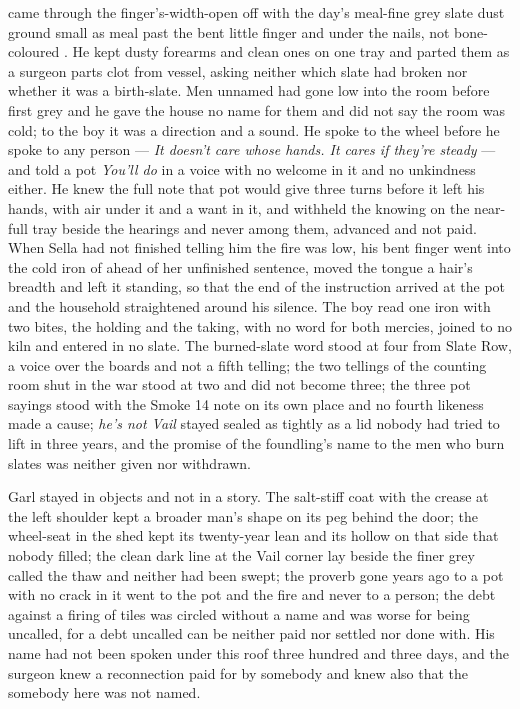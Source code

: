  came through the finger's-width-open  off  with the day's meal-fine grey slate dust ground small as meal past the bent little finger and under the nails, not bone-coloured . He kept dusty forearms and clean ones on one tray and parted them as a surgeon parts clot from vessel, asking neither which slate had broken nor whether it was a birth-slate. Men unnamed had gone low into the room before first grey and he gave the house no name for them and did not say the room was cold; to the boy it was a direction and a sound. He spoke to the wheel before he spoke to any person --- \emph{It doesn't care whose hands. It cares if they're steady} --- and told a pot \emph{You'll do} in a voice with no welcome in it and no unkindness either. He knew the full note that pot would give three turns before it left his hands, with air under it and a want in it, and withheld the knowing on the near-full tray beside the hearings and never among them, advanced and not paid. When Sella had not finished telling him the fire was low, his bent finger went into the cold iron of  ahead of her unfinished sentence, moved the tongue a hair's breadth and left it standing, so that the end of the instruction arrived at the pot and the household straightened around his silence. The boy read one iron with two bites, the holding and the taking, with no  word for both mercies, joined to no kiln and entered in no slate. The burned-slate word stood at four from Slate Row, a voice over the boards and not a fifth telling; the two tellings of the counting room shut in the war stood at two and did not become three; the three pot sayings stood with the Smoke 14 note on its own place and no fourth likeness made a cause; \emph{he's not Vail} stayed sealed as tightly as a lid nobody had tried to lift in three years, and the promise of the foundling's name to the men who burn slates was neither given nor withdrawn.

Garl stayed in objects and not in a story. The salt-stiff coat with the crease at the left shoulder kept a broader man's shape on its peg behind the door; the wheel-seat in the shed kept its twenty-year lean and its hollow on that side that nobody filled; the clean dark line at the Vail corner lay beside the finer grey called the thaw and neither had been swept; the proverb gone years ago to a pot with no crack in it went to the pot and the fire and never to a person; the debt against a firing of tiles was circled without a name and was worse for being uncalled, for a debt uncalled can be neither paid nor settled nor done with. His name had not been spoken under this roof three hundred and three days, and the surgeon knew a reconnection paid for by somebody and knew also that the somebody here was not named.

